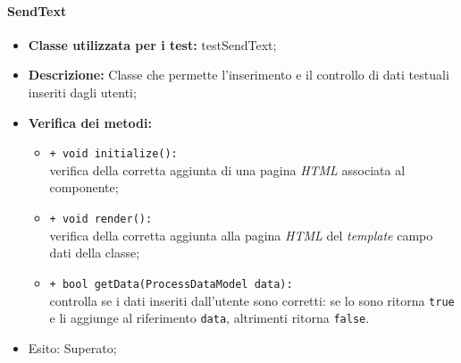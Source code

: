\paragraph{SendText}
\begin{flushleft}
\begin{itemize}
\item \textbf{Classe utilizzata per i test:} testSendText;
\item \textbf{Descrizione:} Classe che permette l'inserimento e il controllo di dati testuali inseriti dagli utenti;
\item \textbf{Verifica dei metodi:}
\begin{sloppypar}
\begin{itemize}
\item \texttt{+ void initialize():}\\ verifica della corretta aggiunta di una pagina \textit{HTML} associata al componente;
\item \texttt{+ void render():}\\ verifica della corretta aggiunta alla pagina \textit{HTML} del \textit{template} campo dati della classe;
\item \texttt{+ bool getData(ProcessDataModel data):}\\ controlla se i dati inseriti dall'utente sono corretti: se lo sono ritorna \texttt{true} e li aggiunge al riferimento \texttt{data}, altrimenti ritorna \texttt{false}.
\end{itemize}
\end{sloppypar}
\item Esito: Superato;
\end{itemize}
\end{flushleft}

